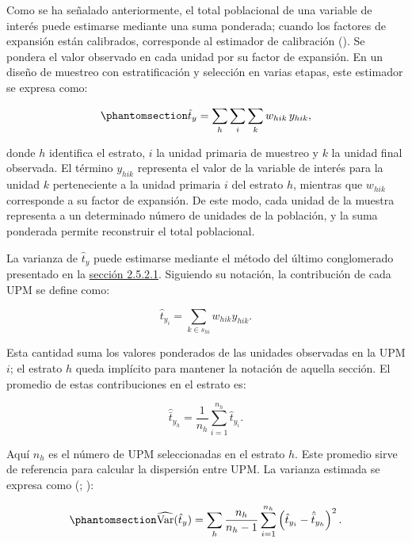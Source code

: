 \documentclass[
  spanish,
  11pt,
  letterpaper,
  oneside,
  open=any]{scrbook}
\begin{document}
Como se ha señalado anteriormente, el total poblacional de una variable
de interés puede estimarse mediante una suma ponderada; cuando los
factores de expansión están calibrados, corresponde al estimador de
calibración ().
Se pondera el valor observado en cada unidad por su factor de expansión.
En un diseño de muestreo con estratificación y selección en varias
etapas, este estimador se expresa como:

\begin{equation}\protect\phantomsection\label{eq-total-ponderado}{
\hat{t}_y =
\sum_{h}
\sum_{i}
\sum_{k}
w_{hik}\,y_{hik},
}\end{equation}

donde \(h\) identifica el estrato, \(i\) la unidad primaria de muestreo
y \(k\) la unidad final observada. El término \(y_{hik}\) representa el
valor de la variable de interés para la unidad \(k\) perteneciente a la
unidad primaria \(i\) del estrato \(h\), mientras que \(w_{hik}\)
corresponde a su factor de expansión. De este modo, cada unidad de la
muestra representa a un determinado número de unidades de la población,
y la suma ponderada permite reconstruir el total poblacional.

La varianza de \(\hat{t}_y\) puede estimarse mediante el método del
último conglomerado presentado en la
\hyperref[ultimo-conglomerado]{sección 2.5.2.1}. Siguiendo su notación,
la contribución de cada UPM se define como:

\[
\hat{t}_{y_i}=\sum_{k\in s_{hi}}w_{hik}y_{hik}.
\]

Esta cantidad suma los valores ponderados de las unidades observadas en
la UPM \(i\); el estrato \(h\) queda implícito para mantener la notación
de aquella sección. El promedio de estas contribuciones en el estrato
es:

\[
\hat{\bar{t}}_{y_h}=\frac{1}{n_h}\sum_{i=1}^{n_h}\hat{t}_{y_i}.
\]

Aquí \(n_h\) es el número de UPM seleccionadas en el estrato \(h\). Este
promedio sirve de referencia para calcular la dispersión entre UPM. La
varianza estimada se expresa como
(;
):

\begin{equation}\protect\phantomsection\label{eq-varianza-total-ponderado}{
\widehat{\operatorname{Var}}(\hat{t}_y)
=
\sum_h \frac{n_h}{n_h-1}
\sum_{i=1}^{n_h}
\left(\hat{t}_{y_i}-\hat{\bar{t}}_{y_h}\right)^2.
}\end{equation}
\end{document}
